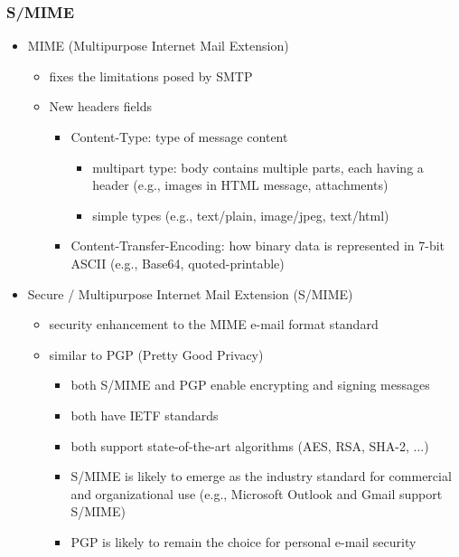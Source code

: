 \documentclass[final]{article}
\begin{document}
\subsubsection*{S/MIME}
\begin{itemize}[nosep]
    \item MIME (Multipurpose Internet Mail Extension)
          \begin{itemize}[nosep]
              \item fixes the limitations posed by SMTP
              \item New headers fields
                    \begin{itemize}[nosep]
                        \item Content-Type: type of message content
                              \begin{itemize}[nosep]
                                  \item multipart type: body contains multiple parts, each having a header (e.g., images in HTML message, attachments)
                                  \item simple types (e.g., text/plain, image/jpeg, text/html)
                              \end{itemize}
                        \item Content-Transfer-Encoding: how binary data is represented in 7-bit ASCII (e.g., Base64, quoted-printable)
                    \end{itemize}
          \end{itemize}
    \item Secure / Multipurpose Internet Mail Extension (S/MIME)
          \begin{itemize}[nosep]
              \item security enhancement to the MIME e-mail format standard
              \item similar to PGP (Pretty Good Privacy)
                    \begin{itemize}[nosep]
                        \item both S/MIME and PGP enable encrypting and signing messages
                        \item both have IETF standards
                        \item both support state-of-the-art algorithms (AES, RSA, SHA-2, ...)
                        \item S/MIME is likely to emerge as the industry standard for commercial and organizational use (e.g., Microsoft Outlook and Gmail support S/MIME)
                        \item PGP is likely to remain the choice for personal e-mail security
                    \end{itemize}
          \end{itemize}
\end{itemize}
\end{document}
